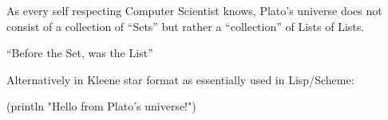 
As every self respecting Computer Scientist knows, Plato's universe does not
consist of a collection of ``Sets'' but rather a ``collection'' of Lists of
Lists.

``Before the Set, was the List''

\begin{bnf*}
\end{bnf*}

Alternatively in Kleene star format as essentially used in Lisp/Scheme:

\begin{bnf*}
\end{bnf*}

\begin{racket}
(println "Hello from Plato's universe!")
\end{racket}